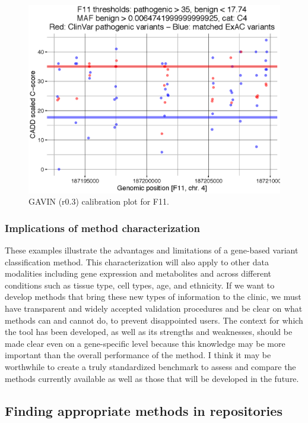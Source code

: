 \begin{figure}
\centering
\includegraphics[scale=0.8]{img/discussion_f11}
\caption{GAVIN (r0.3) calibration plot for F11.}
\label{fig:discussion_f11}
\end{figure}

\subsubsection*{Implications of method characterization}

These examples illustrate the advantages and limitations of a gene-based variant classification method.
This characterization will also apply to other data modalities including gene expression and metabolites and across different conditions such as tissue type, cell types, age, and ethnicity.
If we want to develop methods that bring these new types of information to the clinic, we must have transparent and widely accepted validation procedures and be clear on what methods can and cannot do, to prevent disappointed users.
The context for which the tool has been developed, as well as its strengths and weaknesses, should be made clear even on a gene-specific level because this knowledge may be more important than the overall performance of the method.
I think it may be worthwhile to create a truly standardized benchmark to assess and compare the methods currently available as well as those that will be developed in the future.

\subsection{Finding appropriate methods in repositories} \label{methodsection_finding}

